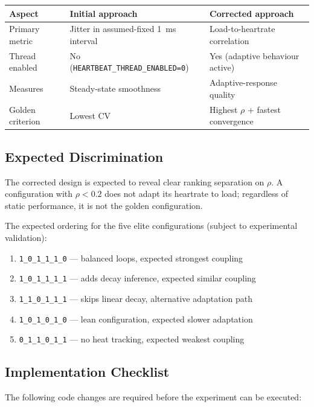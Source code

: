 \begin{center}
\begin{tabular}{lp{5.5cm}p{5.5cm}}
\toprule
Aspect & Initial approach & Corrected approach \\
\midrule
Primary metric & Jitter in assumed-fixed 1~ms interval & Load-to-heartrate correlation \\
Thread enabled & No (\texttt{HEARTBEAT\_THREAD\_ENABLED=0}) & Yes (adaptive behaviour active) \\
Measures & Steady-state smoothness & Adaptive-response quality \\
Golden criterion & Lowest CV & Highest $\rho$ + fastest convergence \\
\bottomrule
\end{tabular}
\end{center}

\subsection{Expected Discrimination}

The corrected design is expected to reveal clear ranking separation on
$\rho$. A configuration with $\rho < 0.2$ does not adapt its heartrate to
load; regardless of static performance, it is not the golden configuration.

The expected ordering for the five elite configurations (subject to
experimental validation):

\begin{enumerate}
  \item \texttt{1\_0\_1\_1\_1\_0} — balanced loops, expected strongest coupling
  \item \texttt{1\_0\_1\_1\_1\_1} — adds decay inference, expected similar coupling
  \item \texttt{1\_1\_0\_1\_1\_1} — skips linear decay, alternative adaptation path
  \item \texttt{1\_0\_1\_0\_1\_0} — lean configuration, expected slower adaptation
  \item \texttt{0\_1\_1\_0\_1\_1} — no heat tracking, expected weakest coupling
\end{enumerate}

\subsection{Implementation Checklist}

The following code changes are required before the experiment can be executed:

